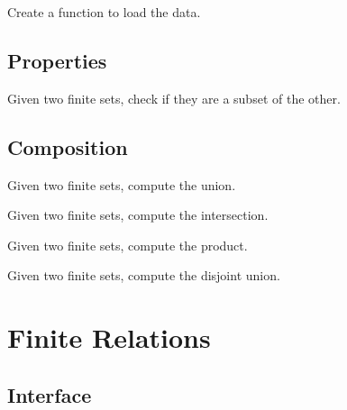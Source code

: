 

\begin{exercise}
  Create a function to load the data.

%

\end{exercise}

\subsection{Properties}

\begin{exercise}
  Given two finite sets, check if they are a subset of the other.
\end{exercise}

\subsection{Composition}

\begin{exercise}
  Given two finite sets, compute the union.


\end{exercise}

\begin{exercise}
  Given two finite sets, compute the intersection.


\end{exercise}



\begin{exercise}
  Given two finite sets, compute the product.


\end{exercise}
\begin{exercise}
  Given two finite sets, compute the disjoint union.


\end{exercise}


\section{Finite Relations}

\subsection*{Interface}

